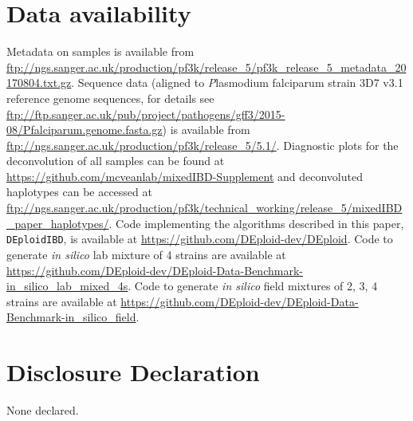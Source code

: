 \documentclass[9pt,lineno]{elife}
\begin{document}
\section{Data availability}
Metadata on samples is available from \url{ftp://ngs.sanger.ac.uk/production/pf3k/release_5/pf3k_release_5_metadata_20170804.txt.gz}.  Sequence data (aligned to {\emph Plasmodium falciparum} strain 3D7 v3.1 reference genome sequences, for details see \url{      ftp://ftp.sanger.ac.uk/pub/project/pathogens/gff3/2015-08/Pfalciparum.genome.fasta.gz}) is available from  \url{ftp://ngs.sanger.ac.uk/production/pf3k/release_5/5.1/}.  Diagnostic plots for the deconvolution of all samples can be found at \url{https://github.com/mcveanlab/mixedIBD-Supplement} and deconvoluted haplotypes can be accessed at \url{ftp://ngs.sanger.ac.uk/production/pf3k/technical_working/release_5/mixedIBD_paper_haplotypes/}. Code implementing the algorithms described in this paper, \texttt{DEploidIBD}, is available at \url{https://github.com/DEploid-dev/DEploid}. Code to generate {\it in silico} lab mixture of 4 strains are available at \url{https://github.com/DEploid-dev/DEploid-Data-Benchmark-in_silico_lab_mixed_4s}. Code to generate {\it in silico} field mixtures of 2, 3, 4 strains are available at \url{https://github.com/DEploid-dev/DEploid-Data-Benchmark-in_silico_field}.



\section{Disclosure Declaration}
None declared.


\appendix
\end{document}
